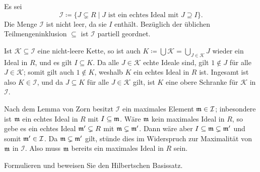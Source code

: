 \begin{solution}
  Es sei
  \[
              \mathcal{I}
    \coloneqq \{J \subsetneq R \mid \text{$J$ ist ein echtes Ideal mit $J \supseteq I$}\}.
  \]
  Die Menge $\mathcal{I}$ ist nicht leer, da sie $I$ enthält.
  Bezüglich der üblichen Teilmengeninklusion $\subseteq$ ist $\mathcal{I}$ partiell geordnet.
  
  Ist $\mathcal{K} \subseteq \mathcal{I}$ eine nicht-leere Kette, so ist auch $K \coloneqq \bigcup \mathcal{K} = \bigcup_{J \in \mathcal{K}} J$ wieder ein Ideal in $R$, und es gilt $I \subseteq K$.
  Da alle $J \in \mathcal{K}$ echte Ideale sind, gilt $1 \notin J$ für alle $J \in \mathcal{K}$;
  somit gilt auch $1 \notin K$, weshalb $K$ ein echtes Ideal in $R$ ist.
  Ingesamt ist also $K \in \mathcal{I}$, und da $J \subseteq K$ für alle $J \in \mathcal{K}$ gilt, ist $K$ eine obere Schranke für $\mathcal{K}$ in $\mathcal{I}$.
  
  Nach dem Lemma von Zorn besitzt $\mathcal{I}$ ein maximales Element $\mathfrak{m} \in \mathcal{I}$;
  inbesondere ist $\mathfrak{m}$ ein echtes Ideal in $R$ mit $I \subseteq \mathfrak{m}$.
  Wäre $\mathfrak{m}$ kein maximales Ideal in $R$, so gebe es ein echtes Ideal $\mathfrak{m}' \subsetneq R$ mit $\mathfrak{m} \subsetneq \mathfrak{m}'$.
  Dann wäre aber $I \subseteq \mathfrak{m} \subsetneq \mathfrak{m}'$ und somit $\mathfrak{m}' \in \mathcal{I}$.
  Da $\mathfrak{m} \subsetneq \mathfrak{m}'$ gilt, stünde dies im Widerspruch zur Maximalität von $\mathfrak{m}$ in $\mathcal{I}$.
  Also muss $\mathfrak{m}$ bereits ein maximales Ideal in $R$ sein.
\end{solution}


\begin{question}[subtitle = Der Hilbertsche Basissatz]
  \label{question: Hilbert basis theorem}
  Formulieren und beweisen Sie den Hilbertschen Basissatz.
\end{question}


